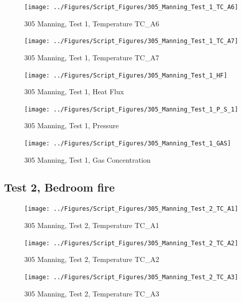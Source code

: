 \documentclass[12pt,oneside]{book}
\begin{document}
\begin{figure}[!ht]
\texttt{[image: ../Figures/Script\_Figures/305\_Manning\_Test\_1\_TC\_A6]}
\caption{305 Manning, Test 1, Temperature TC\_A6}
\label{fig:305_Manning_Test_1_TC_A6}
\end{figure}

\begin{figure}[!ht]
\texttt{[image: ../Figures/Script\_Figures/305\_Manning\_Test\_1\_TC\_A7]}
\caption{305 Manning, Test 1, Temperature TC\_A7}
\label{fig:305_Manning_Test_1_TC_A7}
\end{figure}

\begin{figure}[!ht]
\texttt{[image: ../Figures/Script\_Figures/305\_Manning\_Test\_1\_HF]}
\caption{305 Manning, Test 1, Heat Flux}
\label{fig:305_Manning_Test_1_HF}
\end{figure}

\begin{figure}[!ht]
\texttt{[image: ../Figures/Script\_Figures/305\_Manning\_Test\_1\_P\_S\_1]}
\caption{305 Manning, Test 1, Pressure}
\label{fig:305_Manning_Test_1_P_S_1}
\end{figure}

\begin{figure}[!ht]
\texttt{[image: ../Figures/Script\_Figures/305\_Manning\_Test\_1\_GAS]}
\caption{305 Manning, Test 1, Gas Concentration}
\label{fig:305_Manning_Test_1_GAS}
\end{figure}


\clearpage


\subsection{Test 2, Bedroom fire}

\begin{figure}[!ht]
\texttt{[image: ../Figures/Script\_Figures/305\_Manning\_Test\_2\_TC\_A1]}
\caption{305 Manning, Test 2, Temperature TC\_A1}
\label{fig:305_Manning_Test_2_TC_A1}
\end{figure}

\begin{figure}[!ht]
\texttt{[image: ../Figures/Script\_Figures/305\_Manning\_Test\_2\_TC\_A2]}
\caption{305 Manning, Test 2, Temperature TC\_A2}
\label{fig:305_Manning_Test_2_TC_A2}
\end{figure}

\begin{figure}[!ht]
\texttt{[image: ../Figures/Script\_Figures/305\_Manning\_Test\_2\_TC\_A3]}
\caption{305 Manning, Test 2, Temperature TC\_A3}
\label{fig:305_Manning_Test_2_TC_A3}
\end{figure}
\end{document}
